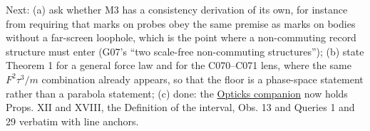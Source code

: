 \documentclass[11pt,a4paper]{article}
\begin{document}
Next: (a) ask whether M3 has a consistency derivation of its own, for
instance from requiring that marks on probes obey the same premise as
marks on bodies without a far-screen loophole, which is the point where
a non-commuting record structure must enter (G07's ``two scale-free
non-commuting structures''); (b) state Theorem 1 for a general force law
and for the C070--C071 lens, where the same \(F^2\tau^3/m\) combination
already appears, so that the floor is a phase-space statement rather
than a parabola statement; (c) done: the
\href{../docs/classics/Newton_Opticks_1730_fits_and_queries.md}{Opticks
companion} now holds Props. XII and XVIII, the Definition of the
interval, Obs. 13 and Queries 1 and 29 verbatim with line anchors.
\end{document}
